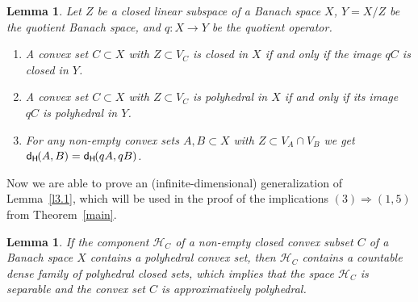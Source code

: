 \documentclass{amsart}
\newcommand{\HH}{\mathcal H}
\newcommand{\Ra}{\Rightarrow}
\newcommand{\dH}{\mathsf{d}_{\mathsf H}\kern-1pt}
\newtheorem{lemma}[theorem]{Lemma}
\theoremstyle{definition}
\begin{document}
\begin{lemma}\label{l3.3} Let $Z$ be a closed linear subspace of a Banach space $X$, $Y=X/Z$ be the quotient Banach space, and $q:X\to Y$ be the quotient operator.
\begin{enumerate}
\item A convex set $C\subset X$ with $Z\subset V_C$ is closed in $X$ if and only if the image $qC$ is closed in $Y$.
\item A convex set $C\subset X$ with $Z\subset V_C$ is polyhedral in $X$ if and only if its image $qC$ is polyhedral in $Y$.
\item For any non-empty convex sets $A,B\subset X$ with $Z\subset V_A\cap V_B$ we get $\dH(A,B)=\dH(qA,qB)$.
\end{enumerate}
\end{lemma}

Now we are able to prove an (infinite-dimensional) generalization of Lemma~\ref{l3.1}, which will be used in the proof of the implications $(3)\Ra(1,5)$ from Theorem~\ref{main}.

\begin{lemma}\label{l3.4} If the component $\HH_C$ of a non-empty closed convex subset $C$ of a Banach space $X$ contains a polyhedral convex set, then $\HH_C$ contains a countable dense family of polyhedral closed sets, which implies that the space $\HH_C$ is separable and the convex set $C$ is approximatively polyhedral.
\end{lemma}
\end{document}
